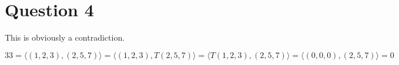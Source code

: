 \section*{Question 4}
This is obviously a contradiction.

$ 33 = \langle (1,2,3), (2,5,7) \rangle = \langle (1,2,3), T(2,5,7) \rangle = \langle T(1,2,3), (2,5,7) \rangle = \langle (0,0,0), (2,5,7) \rangle = 0 $
